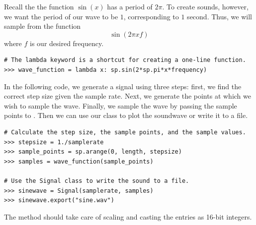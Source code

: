 Recall the the function $\sin(x)$ has a period of $2\pi$.
To create sounds, however, we want the period of our wave to be $1$, corresponding to $1$ second.
Thus, we will sample from the function
\[
\sin(2\pi xf)
\]
where $f$ is our desired frequency.

\begin{lstlisting}
# The lambda keyword is a shortcut for creating a one-line function.
>>> wave_function = lambda x: sp.sin(2*sp.pi*x*frequency)
\end{lstlisting}

In the following code, we generate a signal using three steps: first, we find the correct step size given the sample rate.
Next, we generate the points at which we wish to sample the wave.
Finally, we sample the wave by passing the sample points to .
Then we can use our  class to plot the soundwave or write it to a file.

\begin{lstlisting}
# Calculate the step size, the sample points, and the sample values.
>>> stepsize = 1./samplerate
>>> sample_points = sp.arange(0, length, stepsize)
>>> samples = wave_function(sample_points)

# Use the Signal class to write the sound to a file.
>>> sinewave = Signal(samplerate, samples)
>>> sinewave.export("sine.wav")
\end{lstlisting}

The  method should take care of scaling and casting the entries as 16-bit integers.

